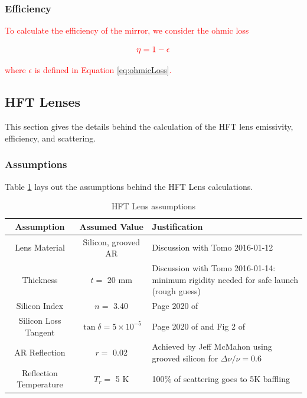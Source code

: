 \documentclass[12pt, titlepage]{article} %
\begin{document}

\subsubsection{Efficiency}

\textcolor{red}{To calculate the efficiency of the mirror, we consider the ohmic loss}

\begin{equation}
	\textcolor{red}{\eta = 1 	- \epsilon}
\end{equation}

\textcolor{red}{where $\epsilon$ is defined in Equation \ref{eq:ohmicLoss}.} 


\subsection{HFT Lenses}

This section gives the details behind the calculation of the HFT lens emissivity, efficiency, and scattering.


\subsubsection{Assumptions}

Table \ref{table:hftLensAssmp} lays out the assumptions behind the HFT Lens calculations.

\begin{table}[H]
	\centering
	\begin{tabularx}{\textwidth}{|| c | c | X ||}
	\hline
	Assumption & Assumed Value & Justification \\
	\hline
	\hline
	Lens Material & Silicon, grooved AR & Discussion with Tomo 2016-01-12 \\
	\hline
	Thickness & $t =$ 20 mm & Discussion with Tomo 2016-01-14: minimum rigidity needed for safe launch (rough guess) \\
	\hline
	Silicon Index & $n =$ 3.40 & Page 2020 of \cite{lamb} \\
	\hline
	Silicon Loss Tangent & $\tan{\delta} = \mathrm{5 \times 10^{-5}}$ & Page 2020 of \cite{lamb} and Fig 2 of \cite{parshin} \\
	\hline
	AR Reflection & $r =$ 0.02 & Achieved by Jeff McMahon using grooved silicon for $\Delta \nu / \nu = 0.6$ \\
	\hline
	Reflection Temperature & $T_{r} =$ 5 K & 100\% of scattering goes to 5K baffling \\
	\hline
	\end{tabularx}
\caption{HFT Lens assumptions \label{table:hftLensAssmp}}
\end{table}
\end{document}
